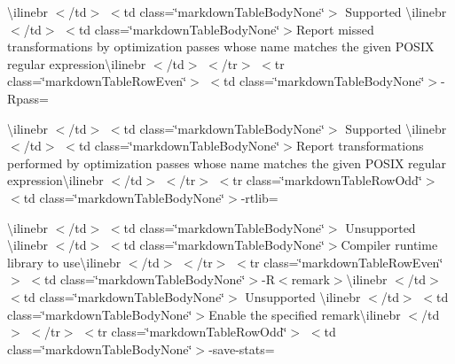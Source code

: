 \begin{longtabu}
{\ttfamily \textbackslash{}ilinebr \texorpdfstring{$<$}{<}/td\texorpdfstring{$>$}{>} \texorpdfstring{$<$}{<}td class=\char`\"{}markdown\+Table\+Body\+None\char`\"{}\texorpdfstring{$>$}{>} Supported \textbackslash{}ilinebr \texorpdfstring{$<$}{<}/td\texorpdfstring{$>$}{>} \texorpdfstring{$<$}{<}td class=\char`\"{}markdown\+Table\+Body\+None\char`\"{}\texorpdfstring{$>$}{>}}Report missed transformations by optimization passes whose name matches the given POSIX regular expression{\ttfamily \textbackslash{}ilinebr \texorpdfstring{$<$}{<}/td\texorpdfstring{$>$}{>} \texorpdfstring{$<$}{<}/tr\texorpdfstring{$>$}{>} \texorpdfstring{$<$}{<}tr class=\char`\"{}markdown\+Table\+Row\+Even\char`\"{}\texorpdfstring{$>$}{>} \texorpdfstring{$<$}{<}td class=\char`\"{}markdown\+Table\+Body\+None\char`\"{}\texorpdfstring{$>$}{>}}-\/Rpass=

{\ttfamily \textbackslash{}ilinebr \texorpdfstring{$<$}{<}/td\texorpdfstring{$>$}{>} \texorpdfstring{$<$}{<}td class=\char`\"{}markdown\+Table\+Body\+None\char`\"{}\texorpdfstring{$>$}{>} Supported \textbackslash{}ilinebr \texorpdfstring{$<$}{<}/td\texorpdfstring{$>$}{>} \texorpdfstring{$<$}{<}td class=\char`\"{}markdown\+Table\+Body\+None\char`\"{}\texorpdfstring{$>$}{>}}Report transformations performed by optimization passes whose name matches the given POSIX regular expression{\ttfamily \textbackslash{}ilinebr \texorpdfstring{$<$}{<}/td\texorpdfstring{$>$}{>} \texorpdfstring{$<$}{<}/tr\texorpdfstring{$>$}{>} \texorpdfstring{$<$}{<}tr class=\char`\"{}markdown\+Table\+Row\+Odd\char`\"{}\texorpdfstring{$>$}{>} \texorpdfstring{$<$}{<}td class=\char`\"{}markdown\+Table\+Body\+None\char`\"{}\texorpdfstring{$>$}{>}}-\/rtlib=

{\ttfamily \textbackslash{}ilinebr \texorpdfstring{$<$}{<}/td\texorpdfstring{$>$}{>} \texorpdfstring{$<$}{<}td class=\char`\"{}markdown\+Table\+Body\+None\char`\"{}\texorpdfstring{$>$}{>} Unsupported \textbackslash{}ilinebr \texorpdfstring{$<$}{<}/td\texorpdfstring{$>$}{>} \texorpdfstring{$<$}{<}td class=\char`\"{}markdown\+Table\+Body\+None\char`\"{}\texorpdfstring{$>$}{>}}Compiler runtime library to use{\ttfamily \textbackslash{}ilinebr \texorpdfstring{$<$}{<}/td\texorpdfstring{$>$}{>} \texorpdfstring{$<$}{<}/tr\texorpdfstring{$>$}{>} \texorpdfstring{$<$}{<}tr class=\char`\"{}markdown\+Table\+Row\+Even\char`\"{}\texorpdfstring{$>$}{>} \texorpdfstring{$<$}{<}td class=\char`\"{}markdown\+Table\+Body\+None\char`\"{}\texorpdfstring{$>$}{>}}-\/R$<$remark$>${\ttfamily \textbackslash{}ilinebr \texorpdfstring{$<$}{<}/td\texorpdfstring{$>$}{>} \texorpdfstring{$<$}{<}td class=\char`\"{}markdown\+Table\+Body\+None\char`\"{}\texorpdfstring{$>$}{>} Unsupported \textbackslash{}ilinebr \texorpdfstring{$<$}{<}/td\texorpdfstring{$>$}{>} \texorpdfstring{$<$}{<}td class=\char`\"{}markdown\+Table\+Body\+None\char`\"{}\texorpdfstring{$>$}{>}}Enable the specified remark{\ttfamily \textbackslash{}ilinebr \texorpdfstring{$<$}{<}/td\texorpdfstring{$>$}{>} \texorpdfstring{$<$}{<}/tr\texorpdfstring{$>$}{>} \texorpdfstring{$<$}{<}tr class=\char`\"{}markdown\+Table\+Row\+Odd\char`\"{}\texorpdfstring{$>$}{>} \texorpdfstring{$<$}{<}td class=\char`\"{}markdown\+Table\+Body\+None\char`\"{}\texorpdfstring{$>$}{>}}-\/save-\/stats=


\end{longtabu}
